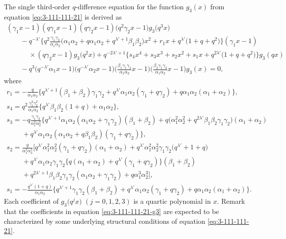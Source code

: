 \documentclass[pdftex]{sigma}
\numberwithin{equation}{section}
\theoremstyle{definition}
\begin{document}
The single third-order $q$-difference equation for the function $g_3(x)$ from equation \eqref{eq:3-111-111-21} is derived as
\begin{gather}
(\gamma_1 x-1)(q \gamma_1 x-1)(q \gamma_2 x-1)\bigl(q^2 \gamma_2 x-1\bigr)g_3\bigl(q^3x\bigr) \nonumber \\
\qquad{}- q^{-\lambda'}\Big\{ q^2 \frac{\gamma_1\gamma_2}{\alpha_1\alpha_2}\bigl(\alpha_1\alpha_2 + q\alpha_1\alpha_2 + q^{\lambda'+1}\beta_1\beta_2\bigr)x^2 +r_1 x + q^{\lambda'}\bigl(1+q+q^2\bigr) \Big\}(\gamma_1 x-1) \nonumber \\
\qquad\phantom{-}{}\times (q \gamma_2 x-1)g_3\bigl(q^2x\bigr) + q^{-2\lambda'+1} \bigl\{ s_4 x^4 + s_3 x^3 + s_2 x^2 + s_1 x + q^{2\lambda'}\bigl(1+q+q^2\bigr) \bigr\} g_3(qx)\! \nonumber \\
\qquad{}- q^3 \bigl(q^{-\lambda'}\alpha_1 x - 1\bigr)\bigl(q^{-\lambda'}\alpha_2 x - 1\bigr)\bigg(\frac{\beta_1\gamma_1\gamma_2}{\alpha_1\alpha_2} x - 1 \bigg)\bigg(\frac{\beta_2\gamma_1\gamma_2}{\alpha_1\alpha_2} x - 1 \bigg) g_3(x)=0, \label{eq:3-111-111-21-g3}
\end{gather}
where
\begin{gather*}
 r_1 = - \frac{q}{\alpha_1\alpha_2}
\bigl\{ q^{\lambda' + 1}(\beta_1+\beta_2)\gamma_1\gamma_2 + q^{\lambda'}\alpha_1\alpha_2(\gamma_1 + q\gamma_2) + q\alpha_1\alpha_2(\alpha_1+ \alpha_2) \bigr\} , \\
s_4 = q^2\frac{\gamma_1^2\gamma_2^2}{\alpha_1\alpha_2} \bigl\{q^{\lambda'}\beta_1\beta_2(1+q) + \alpha_1\alpha_2 \bigr\}, \\
s_3 = -q\frac{\gamma_1\gamma_2}{\alpha_1^2\alpha_2^2}
\bigl\{ q^{\lambda'+1}\alpha_1\alpha_2(\alpha_1\alpha_2 + \gamma_1\gamma_2)(\beta_1 + \beta_2) + q\bigl(\alpha_1^2\alpha_2^2 +
q^{2\lambda'}\beta_1\beta_2\gamma_1\gamma_2\bigr)(\alpha_1 + \alpha_2) \\
\phantom{s_3 =}{} + q^{\lambda'}\alpha_1\alpha_2(\alpha_1\alpha_2 + q\beta_1\beta_2)(\gamma_1 + q\gamma_2) \bigr\}, \\
s_2 = \frac{q}{\alpha_1^2\alpha_2^2}
\big[ q^{\lambda'}\alpha_1^2\alpha_2^2(\gamma_1 + q\gamma_2)(\alpha_1 + \alpha_2) + q^{\lambda'}\alpha_1^2\alpha_2^2\gamma_1\gamma_2\bigl(q^{\lambda'} + 1 + q\bigr) \\
\phantom{s_2 =}{} + q^{\lambda'}\alpha_1\alpha_2\gamma_1\gamma_2 \bigl\{ q(\alpha_1 + \alpha_2) + q^{\lambda'}(\gamma_1 + q\gamma_2) \bigr\} (\beta_1 + \beta_2) \\
\phantom{s_2 =}{} + q^{2\lambda'+1}\beta_1\beta_2\gamma_1\gamma_2(\alpha_1\alpha_2 + \gamma_1\gamma_2) + q\alpha_1^3\alpha_2^3\big], \\
s_1 = -\frac{q^{\lambda'}(1+q)}{\alpha_1\alpha_2}
\bigl\{ q^{\lambda'+1}\gamma_1\gamma_2(\beta_1 + \beta_2) + q^{\lambda'}\alpha_1\alpha_2(\gamma_1 + q\gamma_2) + q\alpha_1\alpha_2(\alpha_1 + \alpha_2) \bigr\}.
\end{gather*}
Each coefficient of $g_3 \bigl(q^j x\bigr)$ $(j=0,1,2,3)$ is a quartic polynomial in $x$.
Remark that the coefficients in equation \eqref{eq:3-111-111-21-g3} are expected to be characterized by some underlying structural conditions of equation \eqref{eq:3-111-111-21}.
\end{document}
